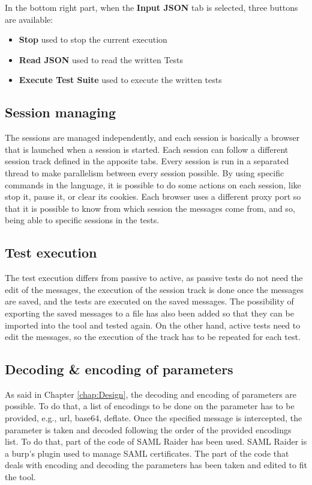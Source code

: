 In the bottom right part, when the \textbf{Input JSON} tab is selected, three buttons are available:
\begin{itemize}
    \item \textbf{Stop} used to stop the current execution
    \item \textbf{Read JSON} used to read the written Tests
    \item \textbf{Execute Test Suite} used to execute the written tests
\end{itemize}

\subsection{Session managing}
The sessions are managed independently, and each session is basically a browser that is launched when a session is started. Each session can follow a different \gls{session track} defined in the apposite tabs. Every session is run in a separated thread to make parallelism between every session possible. By using specific commands in the language, it is possible to do some actions on each session, like stop it, pause it, or clear its cookies. Each browser uses a different proxy port so that it is possible to know from which session the messages come from, and so, being able to specific sessions in the tests.

\subsection{Test execution}
The test execution differs from passive to active, as passive tests do not need the edit of the messages, the execution of the \gls{session track} is done once the messages are saved, and the tests are executed on the saved messages. The possibility of exporting the saved messages to a file has also been added so that they can be imported into the tool and tested again.
On the other hand, active tests need to edit the messages, so the execution of the track has to be repeated for each test.

\subsection{Decoding \& encoding of parameters}
As said in Chapter \ref{chap:Design}, the decoding and encoding of parameters are possible. To do that, a list of encodings to be done on the parameter has to be provided, e.g., url, base64, deflate. Once the specified message is intercepted, the parameter is taken and decoded following the order of the provided encodings list. To do that, part of the code of SAML Raider \cite{saml_raider} has been used. SAML Raider is a \Gls{burp}'s plugin used to manage \Gls{SAML} certificates. The part of the code that deals with encoding and decoding the parameters has been taken and edited to fit the tool.

